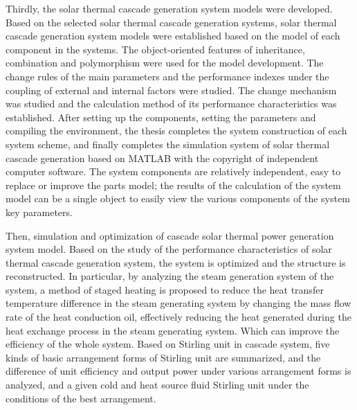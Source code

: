 Thirdly, the solar thermal cascade generation system models were developed. Based on the selected solar thermal cascade generation systems, solar thermal cascade generation system models were established based on the model of each component in the systems. The object-oriented features of inheritance, combination and polymorphism were used for the model development. The change rules of the main parameters and the performance indexes under the coupling of external and internal factors were studied. The change mechanism was studied and the calculation method of its performance characteristics was established. After setting up the components, setting the parameters and compiling the environment, the thesis completes the system construction of each system scheme, and finally completes the simulation system of solar thermal cascade generation based on MATLAB with the copyright of independent computer software. The system components are relatively independent, easy to replace or improve the parts model; the results of the calculation of the system model can be a single object to easily view the various components of the system key parameters.

Then, simulation and optimization of cascade solar thermal power generation system model. Based on the study of the performance characteristics of solar thermal cascade generation system, the system is optimized and the structure is reconstructed. In particular, by analyzing the steam generation system of the system, a method of staged heating is proposed to reduce the heat transfer temperature difference in the steam generating system by changing the mass flow rate of the heat conduction oil, effectively reducing the heat generated during the heat exchange process in the steam generating system. Which can improve the efficiency of the whole system. Based on Stirling unit in cascade system, five kinds of basic arrangement forms of Stirling unit are summarized, and the difference of unit efficiency and output power under various arrangement forms is analyzed, and a given cold and heat source fluid Stirling unit under the conditions of the best arrangement.

